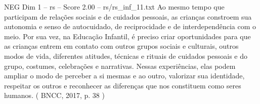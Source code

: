 \begin{textsample}{NEG Dim 1 – rs – Score 2.00 – rs/rs\_inf\_11.txt}
Ao mesmo tempo que participam de relações sociais e de cuidados pessoais, as crianças constroem sua autonomia e senso de autocuidado, de reciprocidade e de interdependência com o meio.
Por sua vez, na Educação Infantil, é preciso criar oportunidades para que as crianças entrem em contato com outros grupos sociais e culturais, outros modos de vida, diferentes atitudes, técnicas e rituais de cuidados pessoais e do grupo, costumes, celebrações e narrativas.
Nessas experiências, elas podem ampliar o modo de perceber a si mesmas e ao outro, valorizar sua identidade, respeitar os outros e reconhecer as diferenças que nos constituem como seres humanos. ( BNCC, 2017, p. 38 )

\end{textsample}

